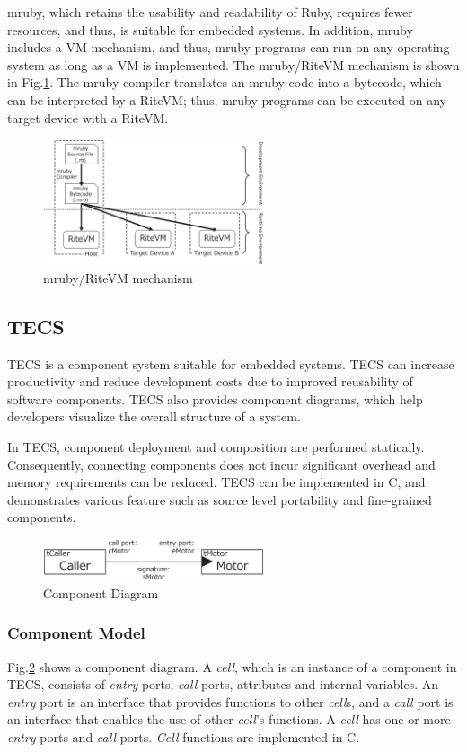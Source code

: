 \documentclass[S,R,E]{article/compsoft}
\begin{document}
mruby, which retains the usability and readability of Ruby, requires fewer resources, and thus, is suitable for embedded systems.
In addition, mruby includes a VM mechanism, and thus, mruby programs can run on any operating system as long as a VM is implemented.
The mruby/RiteVM mechanism is shown in Fig.\ref{fig:mruby}.
The mruby compiler translates an mruby code into a bytecode, which can be interpreted by a RiteVM; thus, mruby programs can be executed on any target device with a RiteVM.
\begin{figure}[t]
    \centering
    \includegraphics[width=6.5cm,clip]{figure/mruby.eps}
    \caption{mruby/RiteVM mechanism}
    \label{fig:mruby}
\end{figure}

\subsection{TECS}
\label{sec:TECS}
TECS is a component system suitable for embedded systems.
TECS can increase productivity and reduce development costs due to improved reusability of software components.
TECS also provides component diagrams, which help developers visualize the overall structure of a system.

In TECS, component deployment and composition are performed statically.
Consequently, connecting components does not incur significant overhead and memory requirements can be reduced.
TECS can be implemented in C, and demonstrates various feature such as source level portability and fine-grained components.

\begin{figure}[t]
    \centering
    \includegraphics[width=6.5cm,clip]{figure/component_diagram.eps}
    \caption{Component Diagram}
    \label{fig:component}
\end{figure}

\subsubsection{Component Model}
Fig.\ref{fig:component} shows a component diagram.
A {\it cell}, which is an instance of a component in TECS, consists of {\it entry} ports, {\it call} ports, attributes and internal variables.
An {\it entry} port is an interface that provides functions to other {\it cell}s, and a {\it call} port is an interface that enables the use of other {\it cell}'s functions.
A {\it cell} has one or more {\it entry} ports and {\it call} ports.
{\it Cell} functions are implemented in C.
\end{document}
